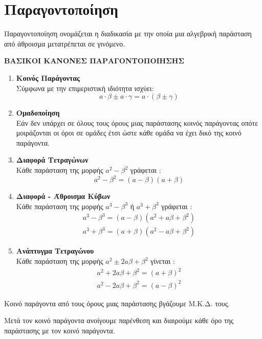 \section{Παραγοντοποίηση}
\Thewria
\orismoi
{}
Παραγοντοποίηση ονομάζεται η διαδικασία με την οποία μια αλγεβρική παράσταση από άθροισμα μετατρέπεται σε γινόμενο.
\begin{center}
\textbf{ΒΑΣΙΚΟΙ ΚΑΝΟΝΕΣ ΠΑΡΑΓΟΝΤΟΠΟΙΗΣΗΣ}
\end{center}
\begin{enumerate}[itemsep=0mm,label=\bf\arabic*.]
\item \textbf{Κοινός Παράγοντας}\\
Σύμφωνα με την επιμεριστική ιδιότητα ισχύει:
\[ a\cdot\beta\pm a\cdot\gamma=a\cdot(\beta\pm\gamma) \]
\item \textbf{Ομαδοποίηση}\\
Εάν δεν υπάρχει σε όλους τους όρους μιας παράστασης κοινός παράγοντας οπότε μοιράζονται οι όροι σε ομάδες έτσι ώστε κάθε ομάδα να έχει δικό της κοινό παράγοντα.
\item \textbf{Διαφορά Τετραγώνων}\\
Κάθε παράσταση της μορφής $ a^2-\beta^2 $ γράφεται : \[ a^2-\beta^2=(a-\beta)(a+\beta) \]
\item \textbf{Διαφορά - Άθροισμα Κύβων}\\
Κάθε παράσταση της μορφής $ a^3-\beta^3 $ ή $ a^3+\beta^3 $ γράφεται : \begin{gather*}
a^3-\beta^3=(a-\beta)\left(a^2+a\beta+\beta^2 \right)\\
a^3+\beta^3=(a+\beta)\left(a^2-a\beta+\beta^2 \right)
\end{gather*}
\item \textbf{Ανάπτυγμα Τετραγώνου}\\
Κάθε παράσταση της μορφής $ a^2\pm2a\beta+\beta^2 $ γίνεται :
\begin{gather*}
a^2+2a\beta+\beta^2=(a+\beta)^2\\
a^2-2a\beta+\beta^2=(a-\beta)^2
\end{gather*}
\end{enumerate}
\Lymena
\begin{Methodos}{7cm}
\begin{bhma}
\item Κοινό παράγοντα από τους όρους μιας παράστασης βγάζουμε Μ.Κ.Δ. τους.
\item Μετά τον κοινό παράγοντα ανοίγουμε παρένθεση και διαιρούμε κάθε όρο της παράστασης με τον κοινό παράγοντα.
\end{bhma}
\end{Methodos}
